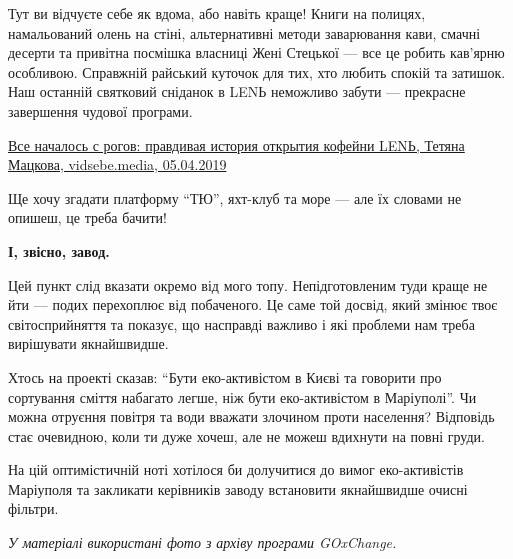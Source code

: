 Тут ви відчуєте себе як вдома, або навіть краще! Книги на полицях, намальований
олень на стіні, альтернативні методи заварювання кави, смачні десерти та
привітна посмішка власниці Жені Стецької — все це робить кав'ярню особливою.
Справжній райський куточок для тих, хто любить спокій та затишок. Наш останній
святковий сніданок в LENЬ неможливо забути — прекрасне завершення чудової
програми.

\begin{center}
	\begin{fminipage}{0.9\textwidth}
		\href{https://vidsebe.media/articles/28930/vse-nachalos-s-rogov-pravdivaya-istoriya-otkrytiya-kofejni-len}{%
Все началось с рогов: правдивая история открытия кофейни LENЬ, Тетяна Мацкова, vidsebe.media, 05.04.2019%
}
	\end{fminipage}
\end{center}

Ще хочу згадати платформу \enquote{ТЮ}, яхт-клуб та море — але їх словами не опишеш, це треба бачити!


\begin{center}
\Large\bfseries І, звісно, завод.
\end{center}

Цей пункт слід вказати окремо від мого топу. Непідготовленим туди краще не йти
— подих перехоплює від побаченого. Це саме той досвід, який змінює твоє
світосприйняття та показує, що насправді важливо і які проблеми нам треба
вирішувати якнайшвидше.


Хтось на проекті сказав: \enquote{Бути еко-активістом в Києві та говорити про
сортування сміття набагато легше, ніж бути еко-активістом в Маріуполі}. Чи
можна отруєння повітря та води вважати злочином проти населення? Відповідь стає
очевидною, коли ти дуже хочеш, але не можеш вдихнути на повні груди.

На цій оптимістичній ноті хотілося би долучитися до вимог еко-активістів
Маріуполя та закликати керівників заводу встановити якнайшвидше очисні фільтри.  

\emph{У матеріалі використані фото з архіву програми GOxChange.}
